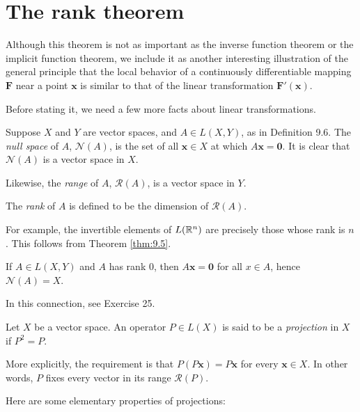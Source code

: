 
\section{The rank theorem}

Although this theorem is not as important as the inverse function theorem or
the implicit function theorem, we include it as another interesting illustration
of the general principle that the local behavior of a continuously differentiable
mapping $\mathbf{F}$ near a point $\mathbf{x}$ is similar to that of the linear transformation $\mathbf{F'(x)}$.

Before stating it, we need a few more facts about linear transformations.

\begin{mydef}
    \label{def:9.30}
    Suppose $X$ and $Y$ are vector spaces, and $A \in L( X, Y)$, as in Definition 9.6. 
    The \emph{null space} of $A$, $\mathscr{N}(A)$, 
    is the set of all $\mathbf{x} \in X$ at which $A \mathbf{x = 0}$.
    It is clear that $\mathscr{N}(A)$ is a vector space in $X$.
    
    Likewise, the \emph{range} of $A$, $\mathscr{R}(A)$, is a vector space in $Y$.

    The \emph{rank} of $A$ is defined to be the dimension of $\mathscr{R}(A)$.
    
    For example, the invertible elements of $L({\protect\mathbb R}^n)$ are precisely those whose rank is $n$. This follows from Theorem \ref{thm:9.5}.
    
    If $A \in L(X, Y)$ and $A$ has rank 0, 
    then $A \mathbf{x = 0}$ for all $x \in A$, 
    hence $\mathscr{N}(A) = X$.
    
    In this connection, see Exercise 25.
\end{mydef}

\begin{mydef}
    Let $X$ be a vector space. An operator $P\in L(X)$ is said to be
    a \emph{projection} in $X$ if $P^2 = P$.

    More explicitly, the requirement is that $P(P \mathbf{x}) = P \mathbf{x}$ for every $\mathbf{x} \in X$. 
    In other words, $P$ fixes every vector in its range $\mathscr{R}(P)$.
\end{mydef}

Here are some elementary properties of projections:




